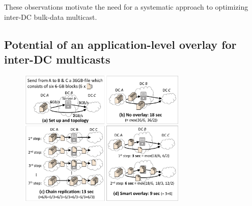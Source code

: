 \vspace{0.1cm}
These observations motivate the need for a systematic approach
to optimizing inter-DC bulk-data multicast.


%
%
%
%

\subsection{Potential of an application-level overlay for inter-DC multicasts}
\label{subsec:motivation:case-for}


\begin{figure}[t]
\centering
\includegraphics[width=80mm]{images/example-junchen.pdf}
\label{fig:case:example}
\vspace{-0.4cm}
\end{figure}

